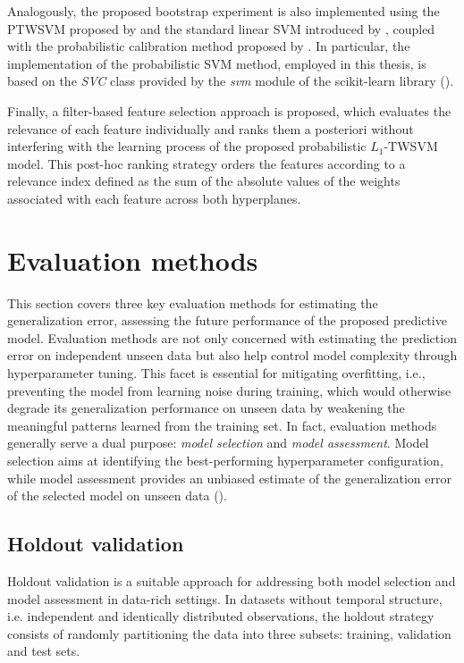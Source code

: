 \documentclass[12pt]{report} %
\begin{document}
Analogously, the proposed bootstrap experiment is also implemented using the PTWSVM proposed by \cite{shao2012probabilistic} and the standard linear SVM introduced by \cite{cortes1995support}, coupled with the probabilistic calibration method proposed by \cite{platt1999probabilistic}. In particular, the implementation of the probabilistic SVM method, employed in this thesis, is based on the \textit{SVC} class provided by the \textit{svm} module of the scikit-learn library (\cite{scikit-learn}).

Finally, a filter-based feature selection approach is proposed, which evaluates the relevance of each feature individually and ranks them a posteriori without interfering with the learning process of the proposed probabilistic $L_1$-TWSVM model. This post-hoc ranking strategy orders the features according to a relevance index defined as the sum of the absolute values of the weights associated with each feature across both hyperplanes.



\chapter{Evaluation methods} \label{chap:evaluation}

This section covers three key evaluation methods for estimating the generalization error, assessing the future performance of the proposed predictive model. Evaluation methods are not only concerned with estimating the prediction error on independent unseen data but also help control model complexity through hyperparameter tuning. This facet is essential for mitigating overfitting, i.e., preventing the model from learning noise during training, which would otherwise degrade its generalization performance on unseen data by weakening the meaningful patterns learned from the training set. In fact, evaluation methods generally serve a dual purpose: \textit{model selection} and \textit{model assessment}. Model selection aims at identifying the best-performing hyperparameter configuration, while model assessment provides an unbiased estimate of the generalization error of the selected model on unseen data (\cite{hastie2009elements}).


\section{Holdout validation} \label{sec:holdout}

Holdout validation is a suitable approach for addressing both model selection and model assessment in data-rich settings. In datasets without temporal structure, i.e. independent and identically distributed observations, the holdout strategy consists of randomly partitioning the data into three subsets: training, validation and test sets.
\end{document}
